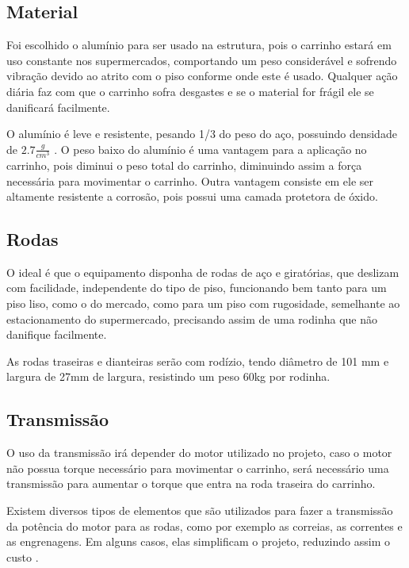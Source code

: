 \subsection{Material}

\par Foi escolhido o alumínio para ser usado na estrutura, pois o carrinho estará em uso constante nos supermercados, comportando um peso considerável e sofrendo vibração devido ao atrito com o piso conforme onde este é usado. Qualquer ação diária faz com que o carrinho sofra desgastes e se o material for frágil ele se danificará facilmente.

\par O alumínio é leve e resistente, pesando 1/3 do peso do aço, possuindo densidade de $2.7\frac{g}{cm^3}$ . O peso baixo do alumínio é uma vantagem para a aplicação no carrinho, pois diminui o peso total do carrinho, diminuindo assim a força necessária para movimentar o carrinho. Outra vantagem consiste em ele ser altamente resistente a corrosão, pois possui uma camada protetora de óxido.

\subsection{Rodas}
O ideal é que o equipamento disponha de rodas de aço e giratórias, que deslizam com facilidade, independente do tipo de piso, funcionando bem tanto para um piso liso, como o do mercado, como para um piso com rugosidade, semelhante ao estacionamento do supermercado, precisando assim de uma rodinha que não danifique facilmente.

\par As rodas traseiras e dianteiras serão com rodízio, tendo diâmetro de 101 mm e largura de 27mm de largura, resistindo um peso 60kg por rodinha.

\subsection{Transmissão}

O uso da transmissão irá depender do motor utilizado no projeto, caso o motor não possua torque necessário para movimentar o carrinho, será necessário uma transmissão para aumentar o torque que entra na roda traseira do carrinho.
	
\par Existem diversos tipos de elementos que são utilizados para fazer a transmissão da potência do motor para as rodas, como por exemplo as correias, as correntes e as engrenagens. Em alguns casos, elas simplificam o projeto, reduzindo assim o custo \cite{Projmec}.

